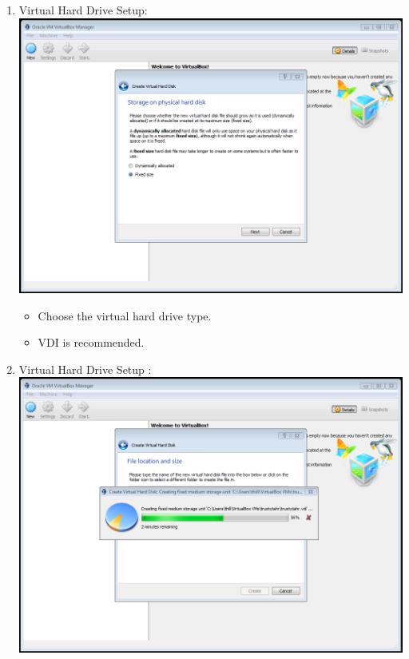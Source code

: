 \documentclass[12pt]{article}
\begin{document}
\begin{description}
\begin{enumerate}
\begin{itemize}
            \end{itemize}
	\newpage
\item Virtual Hard Drive Setup: \vspace{20mm} \\
        \hspace*{-2.5cm}\includegraphics[scale=.6]{Capture5.png}\\
        \begin{itemize}
                        
                \item Choose the virtual hard drive type. 
                \item VDI is recommended.
                           
        \end{itemize}
\newpage
\item Virtual Hard Drive Setup : \vspace{20mm} \\
      		\hspace*{-2.5cm}\includegraphics[scale=.6]{Capture6.png}\\
             \begin{itemize}
                    

\end{itemize}
\end{enumerate}
\end{description}
\end{document}
